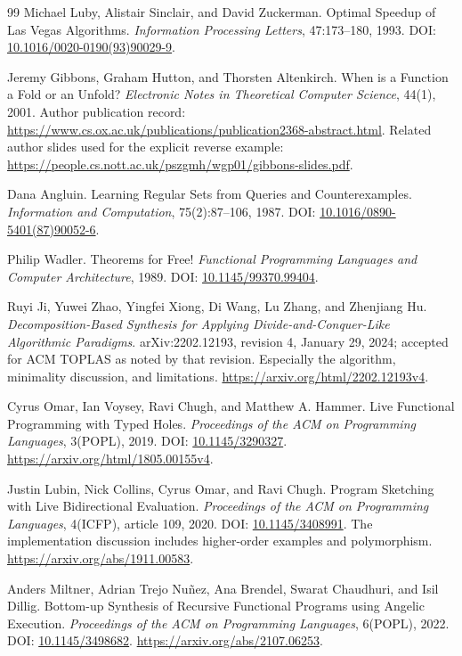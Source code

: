 \documentclass[11pt,a4paper]{article}
\theoremstyle{remark}
\begin{document}
\begin{thebibliography}{99}
Michael Luby, Alistair Sinclair, and David Zuckerman.
Optimal Speedup of Las Vegas Algorithms.
\emph{Information Processing Letters}, 47:173--180, 1993.
DOI: \href{https://doi.org/10.1016/0020-0190(93)90029-9}{10.1016/0020-0190(93)90029-9}.

Jeremy Gibbons, Graham Hutton, and Thorsten Altenkirch.
When is a Function a Fold or an Unfold?
\emph{Electronic Notes in Theoretical Computer Science}, 44(1), 2001.
Author publication record:
\url{https://www.cs.ox.ac.uk/publications/publication2368-abstract.html}.
Related author slides used for the explicit reverse example:
\url{https://people.cs.nott.ac.uk/pszgmh/wgp01/gibbons-slides.pdf}.

Dana Angluin.
Learning Regular Sets from Queries and Counterexamples.
\emph{Information and Computation}, 75(2):87--106, 1987.
DOI: \href{https://doi.org/10.1016/0890-5401(87)90052-6}{10.1016/0890-5401(87)90052-6}.

Philip Wadler.
Theorems for Free!
\emph{Functional Programming Languages and Computer Architecture}, 1989.
DOI: \href{https://doi.org/10.1145/99370.99404}{10.1145/99370.99404}.

Ruyi Ji, Yuwei Zhao, Yingfei Xiong, Di Wang, Lu Zhang, and Zhenjiang Hu.
\emph{Decomposition-Based Synthesis for Applying Divide-and-Conquer-Like
Algorithmic Paradigms}. arXiv:2202.12193, revision 4, January 29, 2024;
accepted for ACM TOPLAS as noted by that revision. Especially the algorithm,
minimality discussion, and limitations.
\url{https://arxiv.org/html/2202.12193v4}.

Cyrus Omar, Ian Voysey, Ravi Chugh, and Matthew A. Hammer.
Live Functional Programming with Typed Holes.
\emph{Proceedings of the ACM on Programming Languages}, 3(POPL), 2019.
DOI: \href{https://doi.org/10.1145/3290327}{10.1145/3290327}.
\url{https://arxiv.org/html/1805.00155v4}.

Justin Lubin, Nick Collins, Cyrus Omar, and Ravi Chugh.
Program Sketching with Live Bidirectional Evaluation.
\emph{Proceedings of the ACM on Programming Languages}, 4(ICFP), article 109,
2020. DOI: \href{https://doi.org/10.1145/3408991}{10.1145/3408991}.
The implementation discussion includes higher-order examples and polymorphism.
\url{https://arxiv.org/abs/1911.00583}.

Anders Miltner, Adrian Trejo Nu\~nez, Ana Brendel, Swarat Chaudhuri, and Isil Dillig.
Bottom-up Synthesis of Recursive Functional Programs using Angelic Execution.
\emph{Proceedings of the ACM on Programming Languages}, 6(POPL), 2022.
DOI: \href{https://doi.org/10.1145/3498682}{10.1145/3498682}.
\url{https://arxiv.org/abs/2107.06253}.


\end{thebibliography}
\end{document}
